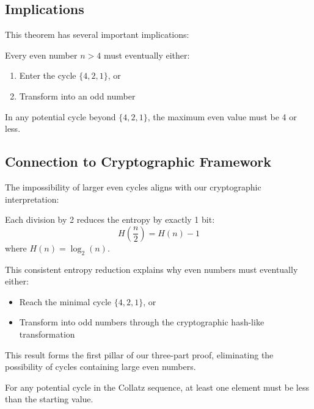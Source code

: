 \subsection{Implications}

This theorem has several important implications:

\begin{corollary}
Every even number $n > 4$ must eventually either:
\begin{enumerate}
\item Enter the cycle $\{4,2,1\}$, or
\item Transform into an odd number
\end{enumerate}
\end{corollary}

\begin{corollary}
In any potential cycle beyond $\{4,2,1\}$, the maximum even value must be 4 or less.
\end{corollary}

\subsection{Connection to Cryptographic Framework}

The impossibility of larger even cycles aligns with our cryptographic interpretation:

\begin{proposition}
Each division by 2 reduces the entropy by exactly 1 bit:
\[
H\left(\frac{n}{2}\right) = H(n) - 1
\]
where $H(n) = \log_2(n)$.
\end{proposition}

This consistent entropy reduction explains why even numbers must eventually either:
\begin{itemize}
\item Reach the minimal cycle $\{4,2,1\}$, or
\item Transform into odd numbers through the cryptographic hash-like transformation
\end{itemize}

This result forms the first pillar of our three-part proof, eliminating the possibility of cycles containing large even numbers.

\begin{theorem}\label{thm:cycle_prevent}
For any potential cycle in the Collatz sequence, at least one element must be less than the starting value.
\end{theorem} 